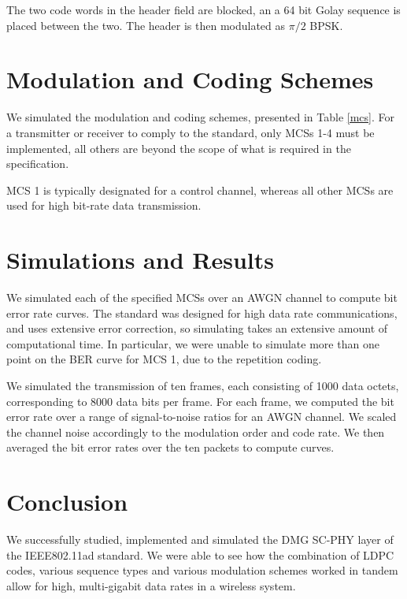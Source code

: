 \documentclass[conference]{IEEEtran}
\begin{document}
The two code words in the header field are blocked, an a 64 bit Golay sequence is placed between the two. The header is then modulated as $\pi/2$ BPSK. 

\section{Modulation and Coding Schemes}
We simulated the modulation and coding schemes, presented in Table \ref{mcs}. For a transmitter or receiver to comply to the standard, only MCSs 1-4 must be implemented, all others are beyond the scope of what is required in the specification.


MCS 1 is typically designated for a control channel, whereas all other MCSs are used for high bit-rate data transmission. 



\section{Simulations and Results} 
We simulated each of the specified MCSs over an AWGN channel to compute bit error rate curves. The standard was designed for high data rate communications, and uses extensive error correction, so simulating takes an extensive amount of computational time. In particular, we were unable to simulate more than one point on the BER curve for MCS 1, due to the repetition coding. 

We simulated the transmission of ten frames, each consisting of 1000 data octets, corresponding to 8000 data bits per frame. For each frame, we computed the bit error rate over a range of signal-to-noise ratios for an AWGN channel. We scaled the channel noise accordingly to the modulation order and code rate. We then averaged the bit error rates over the ten packets to compute curves. 

\section{Conclusion} 
We successfully studied, implemented and simulated the DMG SC-PHY layer of the IEEE802.11ad standard. We were able to see how the combination of LDPC codes, various sequence types and various modulation schemes worked in tandem allow for high, multi-gigabit data rates in a wireless system.



\end{document}
